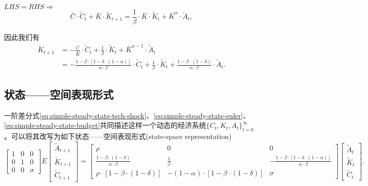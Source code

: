 $LHS=RHS \Rightarrow$
\begin{equation*}
  \bar{C} \cdot \tilde{C}_{t} + \bar{K} \cdot \tilde{K}_{t+1} = \frac{1}{\beta} \cdot \bar{K} \cdot  \tilde{K}_{t} + \bar{K}^{\alpha} \cdot \tilde{A}_t,
\end{equation*}

因此我们有
\begin{equation}
  \label{eq:simple-steady-state-budget}
  \begin{split}
  \tilde{K}_{t+1} &= -\frac{\bar{C}}{\bar{K}} \cdot \tilde{C}_t + \frac{1}{\beta} \cdot \tilde{K}_{t} + \bar{K}^{\alpha -1} \cdot \tilde{A}_{t}\\
  &=-\frac{1-\beta \cdot \left[1-\delta \cdot (1-\alpha) \right]}{\alpha \cdot \beta} \cdot \tilde{C}_{t}+\frac{1}{\beta} \cdot \tilde{K}_{t} + \frac{1-\beta \cdot (1-\delta)}{\alpha \cdot \beta} \cdot \tilde{A}_{t}.
  \end{split}
\end{equation}

\subsection{状态——空间表现形式}
\label{sec:simple-state-space-form}
一阶差分式\eqref{eq:simple-steady-state-tech-shock}、\eqref{eq:simple-steady-state-euler}、\eqref{eq:simple-steady-state-budget}共同描述这样一个动态的经济系统$\{ C_t, K_t, A_t\}_{t=0}^{\infty}$。可以将其改写为如下状态——空间表现形式(state-space representation)
\begin{equation}
  \label{eq:simple-state-space-rep}
\begin{bmatrix}
  1 & 0 & 0\\
  0 & 1 & 0\\
  0 & 0 & \sigma
\end{bmatrix}
E
\begin{bmatrix}
  \tilde{A}_{t+1} \\
  \tilde{K}_{t+1} \\
  \tilde{C}_{t+1}
\end{bmatrix} =
\begin{bmatrix}
  \rho & 0 & 0 \\
  \frac{1-\beta \cdot (1-\delta)}{\alpha \cdot \beta} &
  \frac{1}{\beta} &
  -\frac{1-\beta \cdot \left[1-\delta \cdot (1-\alpha) \right]}{\alpha \cdot \beta} \\
  \rho \cdot \left[1 - \beta \cdot (1-\delta)\right] &
  -\left( 1-\alpha \right) \cdot \left[1 - \beta \cdot (1-\delta)\right] &
  \sigma
\end{bmatrix}
\begin{bmatrix}
  \tilde{A}_{t} \\
  \tilde{K}_{t} \\
  \tilde{C}_{t}
\end{bmatrix}.
\end{equation}

